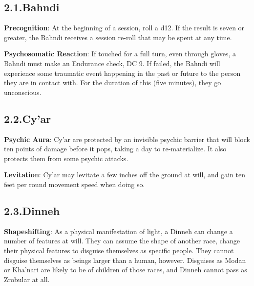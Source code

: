 \documentclass{article}
\begin{document}
\subsection{2.1.\hspace*{0.5em}Bahndi}\label{sec-bahndi}%

\noindent{}\textbf{Precognition}: At the beginning of a session, roll a d12. If the result is seven or greater, the Bahndi receives a session re-roll that may be spent at any time.%

\textbf{Psychosomatic Reaction}: If touched for a full turn, even through gloves, a Bahndi must make an Endurance check, DC 9. If failed, the Bahndi will experience some traumatic event happening in the past or future to the person they are in contact with. For the duration of this (five minutes), they go unconscious.%

\subsection{2.2.\hspace*{0.5em}Cy’ar}\label{sec-cyar}%

\noindent{}\textbf{Psychic Aura}: Cy’ar are protected by an invisible psychic barrier that will block ten points of damage before it pops, taking a day to re-materialize. It also protects them from some psychic attacks.%

\textbf{Levitation}: Cy’ar may levitate a few inches off the ground at will, and gain ten feet per round movement speed when doing so.%

\subsection{2.3.\hspace*{0.5em}Dinneh}\label{sec-dinneh}%

\noindent{}\textbf{Shapeshifting}: As a physical manifestation of light, a Dinneh can change a number of features at will. They can assume the shape of another race, change their physical features to disguise themselves as specific people. They cannot disguise themselves as beings larger than a human, however. Disguises as Modan or Kha'nari are likely to be of children of those races, and Dinneh cannot pass as Zrobular at all.%
\end{document}

